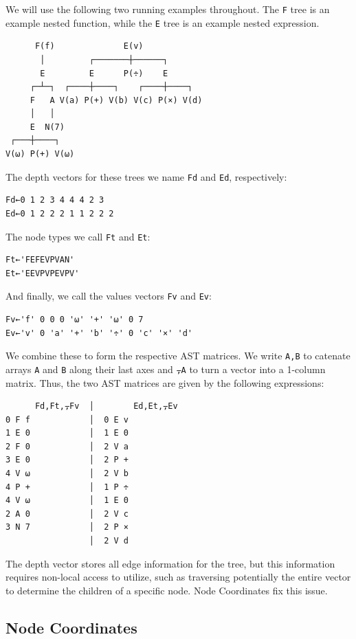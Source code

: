 ﻿\documentclass[numbers,10pt,preprint]{sigplanconf}
\begin{document}
We will use the following two running examples throughout. The \verb;F; tree is an example nested function, while the \verb;E; tree is an example nested expression.

\begin{verbatim}
      F(f)              E(v)
       │         ┌───────┼──────┐
       E         E      P(÷)    E
     ┌─┴─┐  ┌────┼────┐    ┌────┼────┐
     F   A V(a) P(+) V(b) V(c) P(×) V(d)
     │   │
     E  N(7) 
 ┌───┼────┐
V(⍵) P(+) V(⍵)
\end{verbatim}

\noindent
The depth vectors for these trees we name \verb;Fd; and \verb;Ed;, respectively:

\begin{verbatim}
Fd←0 1 2 3 4 4 4 2 3
Ed←0 1 2 2 2 1 1 2 2 2
\end{verbatim}

\noindent
The node types we call \verb;Ft; and \verb;Et;:

\begin{verbatim}
Ft←'FEFEVPVAN'
Et←'EEVPVPEVPV'
\end{verbatim}

\noindent
And finally, we call the values vectors \verb;Fv; and \verb;Ev;:

\begin{verbatim}
Fv←'f' 0 0 0 '⍵' '+' '⍵' 0 7
Ev←'v' 0 'a' '+' 'b' '÷' 0 'c' '×' 'd'
\end{verbatim}

\noindent We combine these to form the respective AST matrices. We write \verb;A,B; to catenate arrays \verb;A; and \verb;B; along their last axes and \verb;⍪A; to turn a vector into a 1-column matrix. Thus, the two AST matrices are given by the following expressions:

\begin{verbatim}
      Fd,Ft,⍪Fv  │        Ed,Et,⍪Ev
0 F f            │  0 E v
1 E 0            │  1 E 0
2 F 0            │  2 V a
3 E 0            │  2 P +
4 V ⍵            │  2 V b
4 P +            │  1 P ÷
4 V ⍵            │  1 E 0
2 A 0            │  2 V c
3 N 7            │  2 P ×
                 │  2 V d
\end{verbatim}

\noindent The depth vector stores all edge information for the tree, but this information requires non-local access to utilize, such as traversing potentially the entire vector to determine the children of a specific node. Node Coordinates fix this issue.

\subsection{Node Coordinates}
\end{document}

